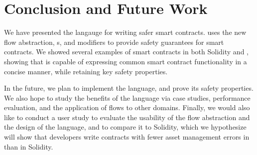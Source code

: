 \documentclass[nonacm, dvipsnames, sigconf]{acmart}
\begin{document}
\section{Conclusion and Future Work}

We have presented the \langName langauge for writing safer smart contracts.
\langName uses the new flow abstraction, \assetTxt{}s, and modifiers to provide safety guarantees for smart contracts.
We showed several examples of smart contracts in both Solidity and \langName, showing that \langName is capable of expressing common smart contract functionality in a concise manner, while retaining key safety properties.

In the future, we plan to implement the \langName language, and prove its safety properties.
We also hope to study the benefits of the language via case studies, performance evaluation, and the application of flows to other domains.
Finally, we would also like to conduct a user study to evaluate the usability of the flow abstraction and the design of the language, and to compare it to Solidity, which we hypothesize will show that developers write contracts with fewer asset management errors in \langName than in Solidity.



\end{document}
